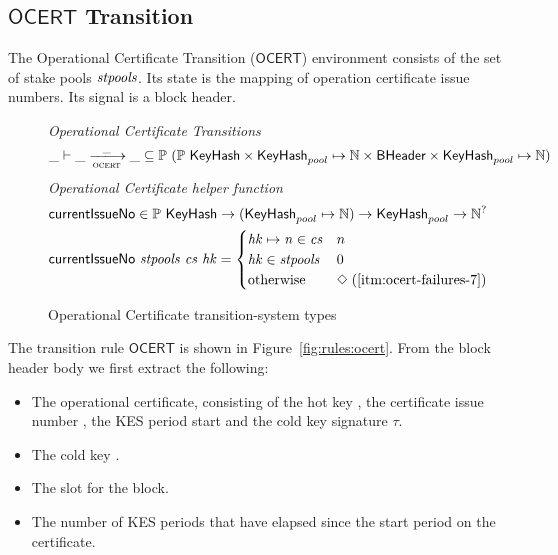 \subsection{$\mathsf{OCERT}$ Transition}
\label{sec:oper-cert-trans}

The Operational Certificate Transition ($\mathsf{OCERT}$) environment consists of the set of stake
pools $\mathit{stpools}$. Its state is the mapping of operation certificate issue numbers.
Its signal is a block header.

\begin{figure}
  \emph{Operational Certificate Transitions}
  \begin{equation*}
    \var{\_} \vdash \var{\_} \trans{ocert}{\_} \var{\_} \subseteq
    \powerset (\powerset{\type{KeyHash}} \times \KeyHash_{pool} \mapsto \N \times \BHeader \times \KeyHash_{pool} \mapsto \N)
  \end{equation*}
  \emph{Operational Certificate helper function}
  \begin{align*}
      & \mathsf{currentIssueNo} \in \mathbb{P}~\mathsf{KeyHash} \to (\mathsf{KeyHash}_{pool} \mapsto \mathbb{N})
                                           \to \mathsf{KeyHash}_{pool}
                                           \to \mathbb{N}^? \\
      & \mathsf{currentIssueNo}~\mathit{stpools}~ \mathit{cs} ~\mathit{hk} =
      \begin{cases}
        \mathit{hk}\mapsto \mathit{n} \in \mathit{cs} & n \\
        \mathit{hk} \in \mathit{stpools} & 0 \\
        \text{otherwise} & \Diamond \; (\ref{itm:ocert-failures-7})
      \end{cases}
  \end{align*}
  \caption{Operational Certificate transition-system types}
  \label{fig:ts-types:ocert}
\end{figure}

The transition rule $\mathsf{OCERT}$ is shown in Figure~\ref{fig:rules:ocert}. From the block
header body  we first extract the following:

\begin{itemize}
  \item The operational certificate, consisting of the hot key ,
    the certificate issue number , the KES period start  and the cold key
  signature $\tau$.
\item The cold key .
\item The slot  for the block.
\item The number of KES periods that have elapsed since the start period on the certificate.
\end{itemize}

